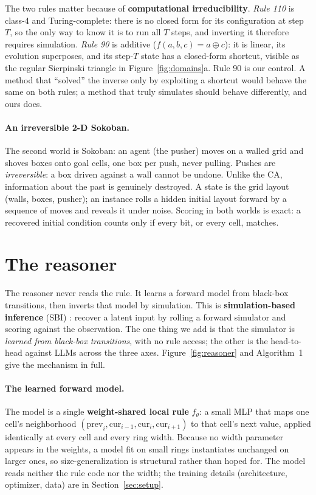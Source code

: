 \documentclass{article}
\begin{document}
The two rules matter because of \textbf{computational irreducibility}. \emph{Rule 110} is class-4
and Turing-complete: there is no closed form for its configuration at step $T$, so the only way to
know it is to run all $T$ steps, and inverting it therefore requires simulation.
\emph{Rule 90} is additive ($f(a,b,c) = a \oplus c$): it is linear, its evolution superposes, and
its step-$T$ state has a closed-form shortcut, visible as the regular Sierpinski triangle in
Figure~\ref{fig:domains}a. Rule 90 is our control. A method that ``solved'' the inverse only by
exploiting a shortcut would behave the same on both rules; a method that truly simulates should
behave differently, and ours does.

\paragraph{An irreversible 2-D Sokoban.}
The second world is Sokoban: an agent (the pusher) moves on a walled grid and shoves boxes onto
goal cells, one box per push, never pulling. Pushes are \emph{irreversible}: a box driven against a
wall cannot be undone. Unlike the CA, information about the past is genuinely destroyed. A
state is the grid layout (walls, boxes, pusher); an instance rolls a hidden initial layout forward
by a sequence of moves and reveals it under noise. Scoring in both worlds is exact: a recovered
initial condition counts only if every bit, or every cell, matches.



\section{The reasoner}
\label{sec:method}

The reasoner never reads the rule. It learns a forward model from black-box transitions, then
inverts that model by simulation. This is \textbf{simulation-based
inference} (SBI) \cite{sbi2020}: recover a latent input by rolling a forward simulator and scoring
against the observation. The one thing we add is that the simulator is \emph{learned from black-box
transitions}, with no rule access; the other is the head-to-head against LLMs across the three axes.
Figure~\ref{fig:reasoner} and Algorithm~1 give the mechanism in full.

\paragraph{The learned forward model.}
The model is a single \textbf{weight-shared local rule} $f_\theta$: a small MLP that maps one
cell's neighborhood $(\text{prev}_i, \text{cur}_{i-1}, \text{cur}_i, \text{cur}_{i+1})$ to that
cell's next value, applied identically at every cell and every ring width. Because no width
parameter appears in the weights, a model fit on small rings instantiates unchanged on larger ones,
so size-generalization is structural rather than hoped for. The model reads neither the rule code nor
the width; the training details (architecture, optimizer, data) are in Section~\ref{sec:setup}.
\end{document}
